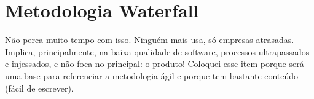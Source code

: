 \chapter{Metodologia Waterfall}

Não perca muito tempo com isso. Ninguém mais usa, só empresas atrasadas.
Implica, principalmente, na baixa qualidade de software, processos
ultrapassados e injessados, e não foca no principal: o produto! Coloquei
esse item porque será uma base para referenciar a metodologia ágil
e porque tem bastante conteúdo (fácil de escrever).